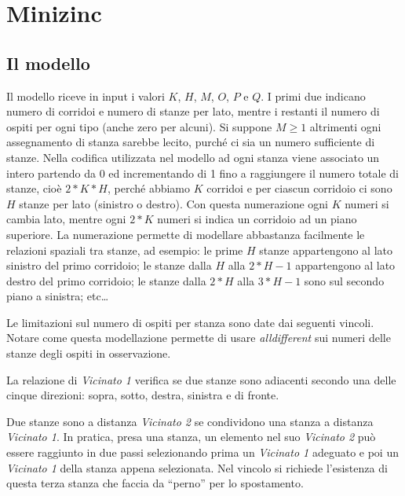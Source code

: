 
\section{Minizinc}
\subsection{Il modello}
Il modello riceve in input i valori $K$, $H$, $M$, $O$, $P$ e $Q$.
I primi due indicano numero di corridoi e numero di stanze per lato, mentre i restanti il numero di ospiti per ogni tipo (anche zero per alcuni).
Si suppone $M \geq 1$ altrimenti ogni assegnamento di stanza sarebbe lecito, purché ci sia un numero sufficiente di stanze.
Nella codifica utilizzata nel modello ad ogni stanza viene associato un intero partendo da 0 ed incrementando di 1 fino a raggiungere il numero totale di stanze, cioè $2*K*H$, perché abbiamo $K$ corridoi e per ciascun corridoio ci sono $H$ stanze per lato (sinistro o destro).
Con questa numerazione ogni $K$ numeri si cambia lato, mentre ogni $2*K$ numeri si indica un corridoio ad un piano superiore.
La numerazione permette di modellare abbastanza facilmente le relazioni spaziali tra stanze,
ad esempio:
le prime $H$ stanze appartengono al lato sinistro del primo corridoio;
le stanze dalla $H$ alla $2*H-1$ appartengono al lato destro del primo corridoio;
le stanze dalla $2*H$ alla $3*H-1$ sono sul secondo piano a sinistra; etc\dots


\noindent
Le limitazioni sul numero di ospiti per stanza sono date dai seguenti vincoli.
Notare come questa modellazione permette di usare \emph{alldifferent} sui numeri delle stanze degli ospiti in osservazione.


\noindent
La relazione di \emph{Vicinato 1} verifica se due stanze sono adiacenti secondo una delle cinque direzioni: sopra, sotto, destra, sinistra e di fronte.


\noindent
Due stanze sono a distanza \emph{Vicinato 2} se condividono una stanza a distanza \emph{Vicinato 1}.
In pratica, presa una stanza, un elemento nel suo \emph{Vicinato 2} può essere raggiunto in due passi selezionando prima un \emph{Vicinato 1} adeguato e poi un \emph{Vicinato 1} della stanza appena selezionata.
Nel vincolo si richiede l'esistenza di questa terza stanza che faccia da ``perno'' per lo spostamento.


